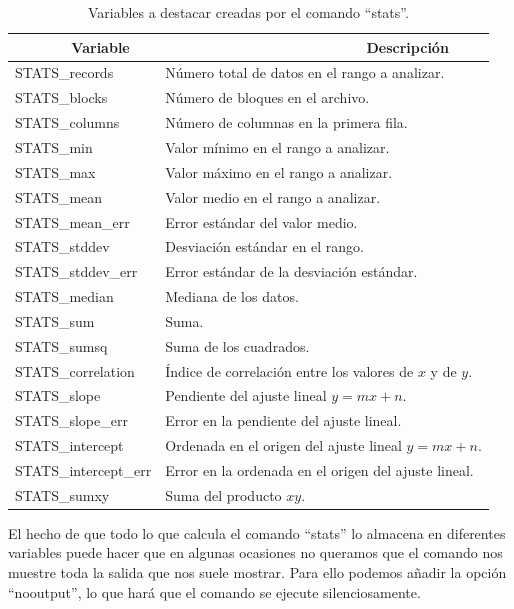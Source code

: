 \documentclass[11pt,a4paper,twoside,pdf]{article}
\numberwithin{equation}{section}
\begin{document}
\begin{table}[h]
	\centering
	\caption{Variables a destacar creadas por el comando ``stats''.}
	\label{tab:VariablesStats} 
	\vspace{10pt}
	\begin{tabular}{l|l}
		\ \ \ \ \ \ \ \textbf{Variable} & \ \ \ \ \ \ \ \ \ \ \ \ \ \ \  \ \ \ \ \ \ \ \ \ \ \textbf{Descripción} \\ \hline
	STATS\_records & Número total de datos en el rango a analizar. \\ 
	STATS\_blocks & Número de bloques en el archivo. \\ 
	STATS\_columns & Número de columnas en la primera fila. \\ 
	STATS\_min & Valor mínimo en el rango a analizar.  \\ 
	STATS\_max & Valor máximo en el rango a analizar. \\ 
	STATS\_mean & Valor medio en el rango a analizar.  \\
	STATS\_mean\_err & Error estándar del valor medio.  \\
	STATS\_stddev & Desviación estándar en el rango. \\
	STATS\_stddev\_err & Error estándar de la desviación estándar. \\
	STATS\_median & Mediana de los datos. \\
	STATS\_sum & Suma.  \\
	STATS\_sumsq & Suma de los cuadrados.  \\
	STATS\_correlation & Índice de correlación entre los valores de $x$ y de $y$. \\
	STATS\_slope & Pendiente del ajuste lineal $y = mx+n$. \\
	STATS\_slope\_err & Error en la pendiente del ajuste lineal. \\
	STATS\_intercept & Ordenada en el origen del ajuste lineal $y = mx+n$. \\
	STATS\_intercept\_err & Error en la ordenada en el origen del ajuste lineal. \\
	STATS\_sumxy & Suma del producto $xy$.
	\end{tabular}
\end{table}

El hecho de que todo lo que calcula el comando ``stats'' lo almacena en diferentes variables puede hacer que en algunas ocasiones no queramos que el comando nos muestre toda la salida que nos suele mostrar. Para ello podemos añadir la opción ``nooutput'', lo que hará que el comando se ejecute silenciosamente. \\
\end{document}
